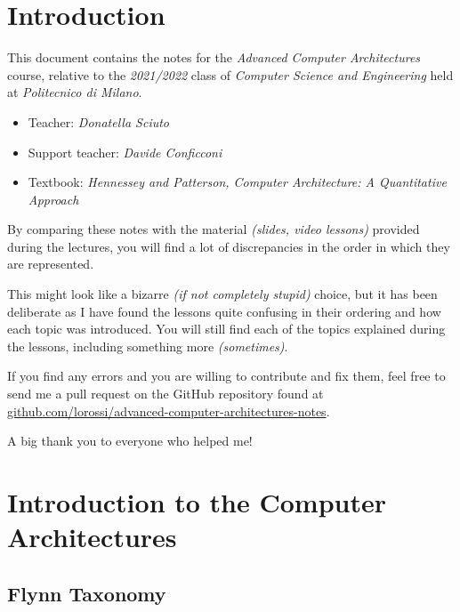 \documentclass[english]{article}
\begin{document}
\makecover

\section*{Introduction}

This document contains the notes for the \textit{Advanced Computer Architectures} course, relative to the \textit{2021/2022} class of \textit{Computer Science and Engineering} held at \textit{Politecnico di Milano}.

\bigskip

\begin{itemize}
  \item Teacher: \textit{Donatella Sciuto}
  \item Support teacher: \textit{Davide Conficconi}
  \item Textbook: \textit{Hennessey and Patterson, Computer Architecture: A Quantitative Approach}
\end{itemize}

\bigskip

By comparing these notes with the material \textit{(slides, video lessons)} provided during the lectures, you will find a lot of discrepancies in the order in which they are represented.

This might look like a bizarre \textit{(if not completely stupid)} choice, but it has been deliberate as I have found the lessons quite confusing in their ordering and how each topic was introduced.
You will still find each of the topics explained during the lessons, including something more \textit{(sometimes)}.

\bigskip

If you find any errors and you are willing to contribute and fix them, feel free to send me a pull request on the GitHub repository found at \href{https://github.com/lorossi/advanced-computer-architectures-notes}{github.com/lorossi/advanced-computer-architectures-notes}.

\bigskip

A big thank you to everyone who helped me!

\clearpage

\section{Introduction to the Computer Architectures}

\subsection{Flynn Taxonomy}
\label{sec:flynn-taxonomy}
\end{document}
